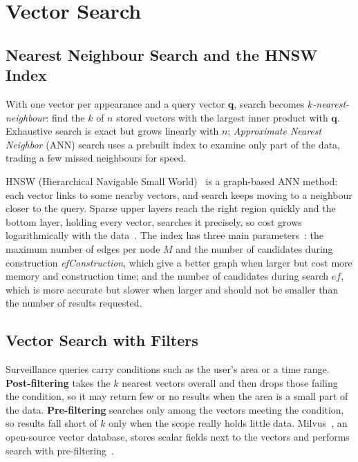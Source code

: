 \section{Vector Search}
\label{sec:3.6}

\subsection{Nearest Neighbour Search and the HNSW Index}
\label{sec:3.6.1}
\label{sec:3.6.2}

With one vector per appearance and a query vector $\mathbf{q}$, search becomes \emph{$k$-nearest-neighbour}: find the $k$ of $n$ stored vectors with the largest inner product with $\mathbf{q}$. Exhaustive search is exact but grows linearly with $n$; \emph{Approximate Nearest Neighbor} (ANN) search uses a prebuilt index to examine only part of the data, trading a few missed neighbours for speed.

HNSW (Hierarchical Navigable Small World)~\cite{malkov2020hnsw} is a graph-based ANN method: each vector links to some nearby vectors, and search keeps moving to a neighbour closer to the query. Sparse upper layers reach the right region quickly and the bottom layer, holding every vector, searches it precisely, so cost grows logarithmically with the data~\cite{malkov2020hnsw}. The index has three main parameters~\cite{milvus2026hnsw}: the maximum number of edges per node $M$ and the number of candidates during construction \textit{ef\-Con\-struc\-tion}, which give a better graph when larger but cost more memory and construction time; and the number of candidates during search $\mathit{ef}$, which is more accurate but slower when larger and should not be smaller than the number of results requested.

\subsection{Vector Search with Filters}
\label{sec:3.6.3}

Surveillance queries carry conditions such as the user's area or a time range. \textbf{Post-filtering} takes the $k$ nearest vectors overall and then drops those failing the condition, so it may return few or no results when the area is a small part of the data. \textbf{Pre-filtering} searches only among the vectors meeting the condition, so results fall short of $k$ only when the scope really holds little data. Milvus~\cite{wang2021milvus}, an open-source vector database, stores scalar fields next to the vectors and performs search with pre-filtering~\cite{milvus2026filtered}.

